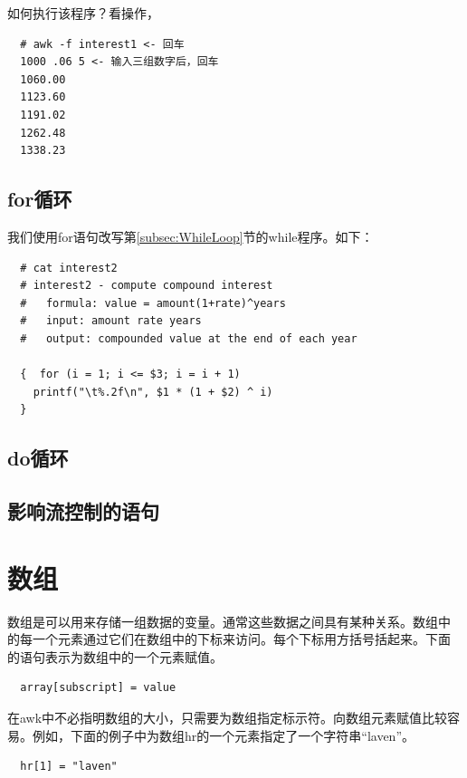 如何执行该程序？看操作，

\small{
\begin{verbatim}
  # awk -f interest1 <- 回车
  1000 .06 5 <- 输入三组数字后，回车
  1060.00
  1123.60
  1191.02
  1262.48
  1338.23
\end{verbatim}
}
\normalsize

\subsection{for循环}
\label{subsec:ForLoop}

我们使用for语句改写第\ref{subsec:WhileLoop}节的while程序。如下：

\small{
\begin{verbatim}
  # cat interest2
  # interest2 - compute compound interest
  #   formula: value = amount(1+rate)^years
  #   input: amount rate years
  #   output: compounded value at the end of each year
  
  {  for (i = 1; i <= $3; i = i + 1)
    printf("\t%.2f\n", $1 * (1 + $2) ^ i)
  }
\end{verbatim}
}
\normalsize

\subsection{do循环}

\subsection{影响流控制的语句}

\section{数组}

数组是可以用来存储一组数据的变量。通常这些数据之间具有某种关系。数组中
的每一个元素通过它们在数组中的下标来访问。每个下标用方括号括起来。下面
的语句表示为数组中的一个元素赋值。

\begin{center}
\begin{verbatim}
  array[subscript] = value
\end{verbatim}
\end{center}


在awk中不必指明数组的大小，只需要为数组指定标示符。向数组元素赋值比较容
易。例如，下面的例子中为数组hr的一个元素指定了一个字符串“laven”。

\begin{verbatim}
  hr[1] = "laven"
\end{verbatim}

